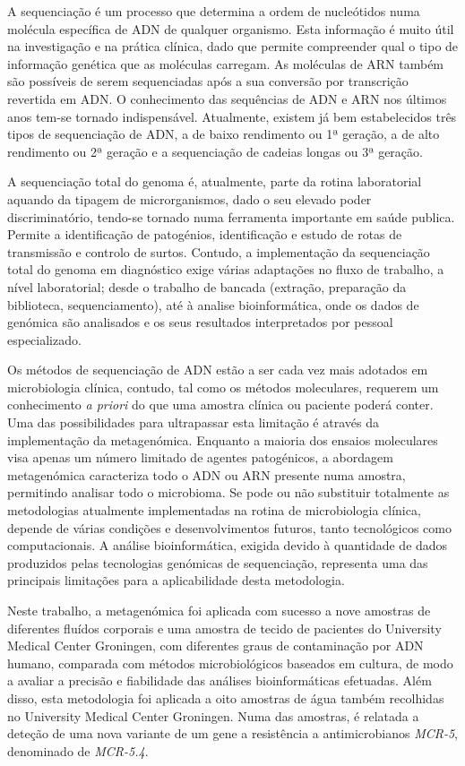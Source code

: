 A sequenciação é um processo que determina a ordem de nucleótidos numa molécula específica de ADN de qualquer organismo. Esta informação é muito útil na investigação e na prática clínica, dado que permite compreender qual o tipo de informação genética que as moléculas carregam. As moléculas de ARN também são possíveis de serem sequenciadas após a sua conversão por transcrição revertida em ADN. O conhecimento das sequências de ADN e ARN nos últimos anos tem-se tornado indispensável. Atualmente, existem já bem estabelecidos três tipos de sequenciação de ADN, a de baixo rendimento ou 1ª geração, a de alto rendimento ou 2ª geração e a sequenciação de cadeias longas ou 3ª geração.

A sequenciação total do genoma é, atualmente, parte da rotina laboratorial aquando da tipagem de microrganismos, dado o seu elevado poder discriminatório, tendo-se tornado numa ferramenta importante em saúde publica. Permite a identificação de patogénios, identificação e estudo de rotas de transmissão e controlo de surtos. Contudo, a implementação da sequenciação total do genoma em diagnóstico exige várias adaptações no fluxo de trabalho, a nível laboratorial; desde o trabalho de bancada (extração, preparação da biblioteca, sequenciamento), até à analise bioinformática, onde os dados de genómica são analisados e os seus resultados interpretados por pessoal especializado.

Os métodos de sequenciação de ADN estão a ser cada vez mais adotados em microbiologia clínica, contudo, tal como os métodos moleculares, requerem um conhecimento \textit{a priori} do que uma amostra clínica ou paciente poderá conter. Uma das possibilidades para ultrapassar esta limitação é através da implementação da metagenómica. Enquanto a maioria dos ensaios moleculares visa apenas um número limitado de agentes patogénicos, a abordagem metagenómica caracteriza todo o ADN ou ARN presente numa amostra, permitindo analisar todo o microbioma. Se pode ou não substituir totalmente as metodologias atualmente implementadas na rotina de microbiologia clínica, depende de várias condições e desenvolvimentos futuros, tanto tecnológicos como computacionais. A análise bioinformática, exigida devido à quantidade de dados produzidos pelas tecnologias genómicas de sequenciação, representa uma das principais limitações para a aplicabilidade desta metodologia.

Neste trabalho, a metagenómica foi aplicada com sucesso a nove amostras de diferentes fluídos corporais e uma amostra de tecido de pacientes do University Medical Center Groningen, com diferentes graus de contaminação por ADN humano, comparada com métodos microbiológicos baseados em cultura, de modo a avaliar a precisão e fiabilidade das análises bioinformáticas efetuadas. Além disso, esta metodologia foi aplicada a oito amostras de água também recolhidas no University Medical Center Groningen. Numa das amostras, é relatada a deteção de uma nova variante de um gene a resistência a antimicrobianos \textit{MCR-5}, denominado de \textit{MCR-5.4}.


